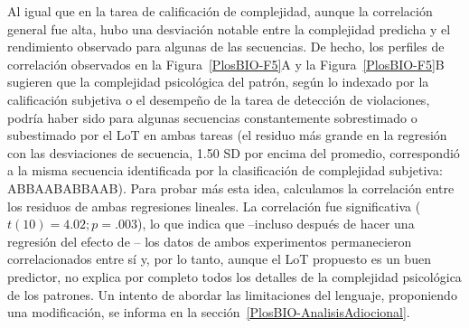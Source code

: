 
Al igual que en la tarea de calificación de complejidad, aunque la correlación general fue alta, hubo una desviación notable entre la complejidad predicha y el rendimiento observado para algunas de las secuencias. De hecho, los perfiles de correlación observados en la Figura~\ref{PlosBIO-F5}A y la Figura~\ref{PlosBIO-F5}B sugieren que la complejidad psicológica del patrón, según lo indexado por la calificación subjetiva o el desempeño de la tarea de detección de violaciones, podría haber sido para algunas secuencias constantemente sobrestimado o subestimado por el LoT en ambas tareas (el residuo más grande en la regresión con las desviaciones de secuencia, 1.50 SD por encima del promedio, correspondió a la misma secuencia identificada por la clasificación de complejidad subjetiva: ABBAABABBAAB). Para probar más esta idea, calculamos la correlación entre los residuos de ambas regresiones lineales. La correlación fue significativa ($t (10) = 4.02; p = .003$), lo que indica que --incluso después de hacer una regresión del efecto de \mdlbin-- los datos de ambos experimentos permanecieron correlacionados entre sí y, por lo tanto, aunque el LoT propuesto es un buen predictor, no explica por completo todos los detalles de la complejidad psicológica de los patrones. Un intento de abordar las limitaciones del lenguaje, proponiendo una modificación, se informa en la sección~\ref{PlosBIO-AnalisisAdiocional}.

